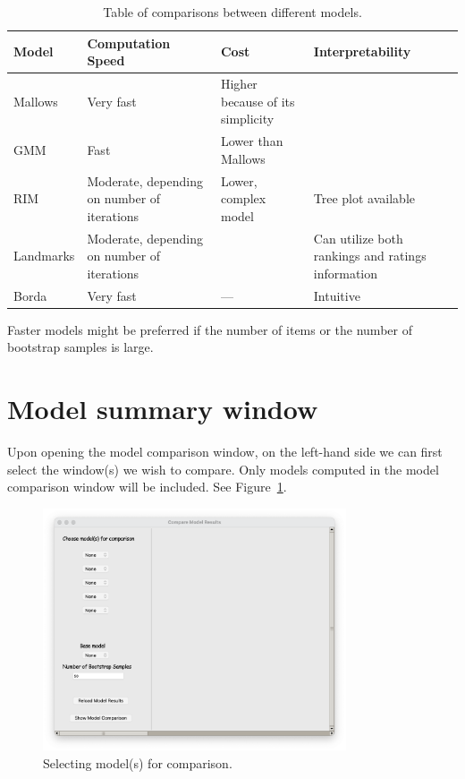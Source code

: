 \documentclass[a4paper,11pt]{memoir}
\begin{document}
\begin{table}[H]
  \centering
  \scriptsize
  \begin{tabular}{l|p{3cm}|p{3cm}|p{3cm}}
    \toprule
    \textbf{Model} & \textbf{Computation Speed} & \textbf{Cost} & \textbf{Interpretability} \\
    \midrule
    Mallows & Very fast & Higher because of its simplicity &  \\[0.5em]
    \hline
    GMM & Fast & Lower than Mallows & \\[0.5em]
    \hline
    RIM & Moderate, depending on number of iterations & Lower, complex model & Tree plot available\\[0.5em]
    \hline
    Landmarks & Moderate, depending on number of iterations &  & Can utilize both rankings and ratings information \\[0.5em]
    \hline
    Borda & Very fast & --- & Intuitive \\
    \bottomrule
  \end{tabular}
  \caption{Table of comparisons between different models.}\label{tab:model}
\end{table}

Faster models might be preferred if the number of items or the number of bootstrap samples is large.



\section{Model summary window}\label{subsec:modelcompare}
Upon opening the model comparison window, 
on the left-hand side we can first select the window(s) 
we wish to compare.
Only models computed in the model comparison window will be included.
See Figure~\ref{fig:summary1}.


\begin{figure}
  \begin{center}
    \includegraphics[width=0.8\textwidth]{art/summary_1.png}
    \caption{Selecting model(s) for comparison.}\label{fig:summary1}
  \end{center}
\end{figure}
\end{document}
